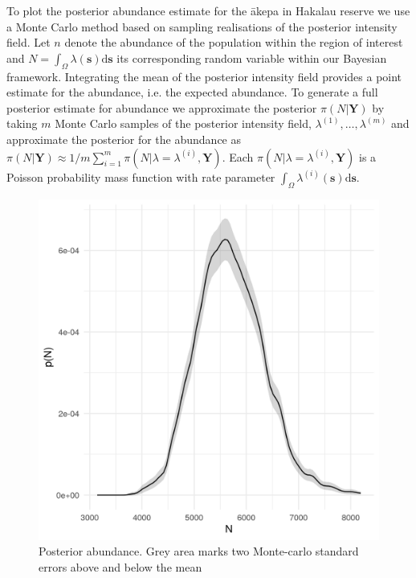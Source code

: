 \documentclass{stylefile16/statsoc}
\newcommand{\bs}{\mathbf{s}}
\newcommand{\bm}{\boldsymbol}  %
\newcommand{\akepa}{\textquotesingle\={a}kepa}  %
\begin{document}
To plot the posterior abundance estimate for the \akepa{} in Hakalau reserve we use a Monte Carlo method based on sampling realisations of the posterior intensity field.  Let $n$ denote the abundance of the population within the region of interest and $N = \int_{\Omega}\lambda(\bs)\mathrm{d}\bs$ its corresponding random variable within our Bayesian framework.  Integrating the mean of the posterior intensity field provides a point estimate for the abundance, i.e. the expected abundance.  To generate a full posterior estimate for abundance we approximate the posterior $\pi(N | \bm{Y})$ by taking $m$ Monte Carlo samples of the posterior intensity field, $\lambda^{(1)}, \ldots, \lambda^{(m)}$ and approximate the posterior for the abundance as $\pi(N | \bm{Y}) \approx 1 / m \sum_{i=1}^m \pi (N | \lambda = \lambda^{(i)}, \bm{Y})$. Each $\pi(N | \lambda = \lambda^{(i)}, \bm{Y})$ is a Poisson probability mass function with rate parameter $\int_{\Omega}\lambda^{(i)}(\bs)\mathrm{d}\bs$. 
\begin{figure}[!htb]
	\begin{center}
		\includegraphics[scale=0.525]{figures/N_posterior.png}
		\caption{Posterior abundance.  Grey area marks two Monte-carlo standard errors above and below the mean}
		\label{fig:realized-abundance-posterior}
	\end{center}
\end{figure}
\end{document}
